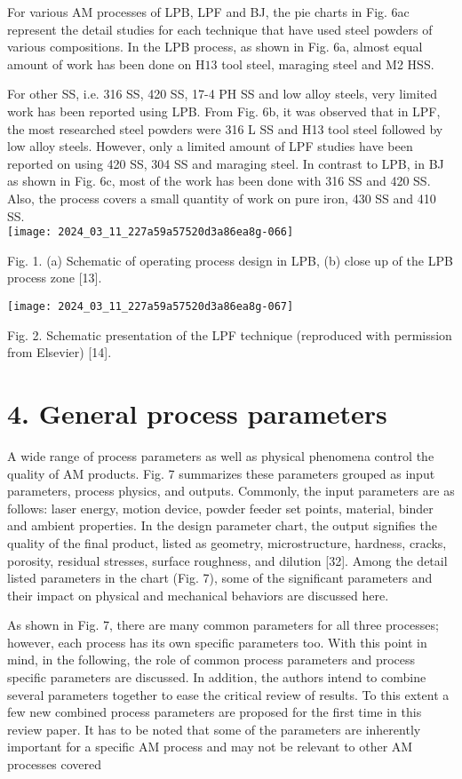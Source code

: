 \documentclass[10pt]{article}
\begin{document}
For various AM processes of LPB, LPF and BJ, the pie charts in Fig. 6a$\mathrm{c}$ represent the detail studies for each technique that have used steel powders of various compositions. In the LPB process, as shown in Fig. 6a, almost equal amount of work has been done on $\mathrm{H} 13$ tool steel, maraging steel and M2 HSS.

For other SS, i.e. 316 SS, 420 SS, 17-4 PH SS and low alloy steels, very limited work has been reported using LPB. From Fig. 6b, it was observed that in LPF, the most researched steel powders were 316 L SS and H13 tool steel followed by low alloy steels. However, only a limited amount of LPF studies have been reported on using 420 SS, 304 SS and maraging steel. In contrast to LPB, in BJ as shown in Fig. 6c, most of the work has been done with 316 SS and 420 SS. Also, the process covers a small quantity of work on pure iron, 430 SS and 410 SS.\\
\texttt{[image: 2024\_03\_11\_227a59a57520d3a86ea8g-066]}

Fig. 1. (a) Schematic of operating process design in LPB, (b) close up of the LPB process zone [13].

\begin{center}
\texttt{[image: 2024\_03\_11\_227a59a57520d3a86ea8g-067]}
\end{center}

Fig. 2. Schematic presentation of the LPF technique (reproduced with permission from Elsevier) [14].

\section*{4. General process parameters}
A wide range of process parameters as well as physical phenomena control the quality of AM products. Fig. 7 summarizes these parameters grouped as input parameters, process physics, and outputs. Commonly, the input parameters are as follows: laser energy, motion device, powder feeder set points, material, binder and ambient properties. In the design parameter chart, the output signifies the quality of the final product, listed as geometry, microstructure, hardness, cracks, porosity, residual stresses, surface roughness, and dilution [32]. Among the detail listed parameters in the chart (Fig. 7), some of the significant parameters and their impact on physical and mechanical behaviors are discussed here.

As shown in Fig. 7, there are many common parameters for all three processes; however, each process has its own specific parameters too. With this point in mind, in the following, the role of common process parameters and process specific parameters are discussed. In addition, the authors intend to combine several parameters together to ease the critical review of results. To this extent a few new combined process parameters are proposed for the first time in this review paper. It has to be noted that some of the parameters are inherently important for a specific AM process and may not be relevant to other AM processes covered
\end{document}
